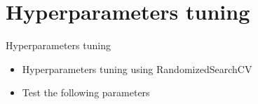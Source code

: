 \documentclass[
 size=14pt,
 paper=smartboard,  %
 mode=present, 		%
 display=slides, 	%
 style=tuliplab,  	%
 pauseslide,
 fleqn,leqno]{powerdot}
\begin{document}
\section{Hyperparameters tuning}

\begin{slide}{Hyperparameters tuning}
\begin{itemize}
\item
Hyperparameters tuning using RandomizedSearchCV
\item 
Test the following parameters
\end{itemize}

\end{slide}


\end{document}
